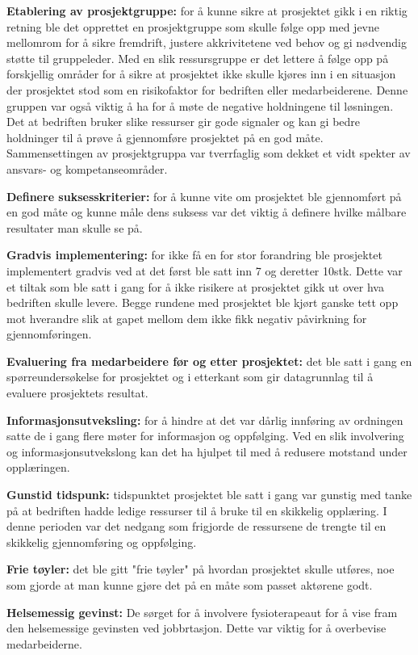 		{\bf Etablering av prosjektgruppe:} for å kunne sikre at prosjektet gikk i en riktig
		retning ble det opprettet en prosjektgruppe som skulle følge opp med jevne mellomrom for 
		å sikre fremdrift, justere akkrivitetene ved behov og gi nødvendig støtte til gruppeleder.
		Med en slik ressursgruppe er det lettere å følge opp på forskjellig områder for å sikre
		at prosjektet ikke skulle kjøres inn i en situasjon der prosjektet stod som en risikofaktor
		for bedriften eller medarbeiderene. Denne gruppen var også viktig å ha for å møte
		de negative holdningene til løsningen. Det at bedriften bruker slike ressurser gir gode
		signaler og kan gi bedre holdninger til å prøve å gjennomføre prosjektet på en god måte. 
		Sammensettingen av prosjektgruppa var tverrfaglig som dekket et vidt spekter av 
		ansvars- og kompetanseområder.

		{\bf Definere suksesskriterier:} for å kunne vite om prosjektet ble gjennomført på en god
		måte og kunne måle dens suksess var det viktig å definere hvilke målbare resultater man 
		skulle se på.

		{\bf Gradvis implementering:} for ikke få en for stor forandring ble prosjektet implementert
		gradvis ved at det først ble satt inn 7 og deretter 10stk. Dette var et tiltak som ble
		satt i gang for å ikke risikere at prosjektet gikk ut over hva bedriften skulle levere.
		Begge rundene med prosjektet ble kjørt ganske tett opp mot hverandre slik at gapet
		mellom dem ikke fikk negativ påvirkning for gjennomføringen. 

		{\bf Evaluering fra medarbeidere før og etter prosjektet:} det ble satt i gang en
		spørreundersøkelse for prosjektet og i etterkant som gir datagrunnlag til å evaluere 
		prosjektets resultat. 

		{\bf Informasjonsutveksling:} for å hindre at det var dårlig innføring av ordningen 
		satte de i gang flere møter for informasjon og oppfølging. 
		Ved en slik involvering og informasjonsutvekslong kan det ha hjulpet til med å 
		redusere motstand under opplæringen.

		{\bf Gunstid tidspunk:} tidspunktet prosjektet ble satt i gang var gunstig med tanke på
		at bedriften hadde ledige ressurser til å bruke til en skikkelig opplæring. I denne 
		perioden var det nedgang som frigjorde de ressursene de trengte til en skikkelig
		gjennomføring og oppfølging. 

		{\bf Frie tøyler:} det ble gitt "frie tøyler" på hvordan prosjektet skulle utføres, 
		noe som gjorde at man kunne gjøre det på en måte som passet aktørene godt. 

		{\bf Helsemessig gevinst:} 	De sørget for å involvere fysioterapeaut for å vise fram 
		den helsemessige gevinsten ved jobbrtasjon. Dette var viktig for å overbevise 
		medarbeiderne.